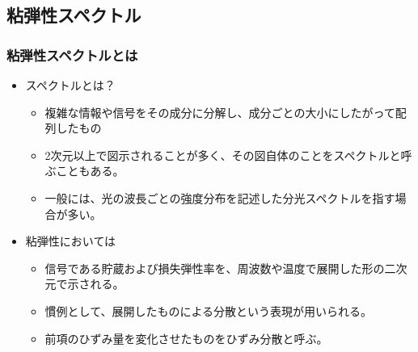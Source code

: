 \documentclass[unicode,12pt]{beamer}%
\begin{document}
\subsection{粘弾性スペクトル}
\begin{frame}
	\frametitle{粘弾性スペクトルとは}
	\begin{itemize}
		\item スペクトルとは？
		\begin{itemize}
			\item 複雑な情報や信号をその成分に分解し、成分ごとの大小にしたがって配列したもの
			\item 2次元以上で図示されることが多く、その図自体のことをスペクトルと呼ぶこともある。
			\item 一般には、光の波長ごとの強度分布を記述した分光スペクトルを指す場合が多い。
		\end{itemize}
		\item 粘弾性においては
		\begin{itemize}
			\item 信号である貯蔵および損失弾性率を、周波数や温度で展開した形の二次元で示される。
			\item 慣例として、展開したものによる分散という表現が用いられる。
			\item 前項のひずみ量を変化させたものをひずみ分散と呼ぶ。
		\end{itemize}
	\end{itemize}
\end{frame}
\end{document}
